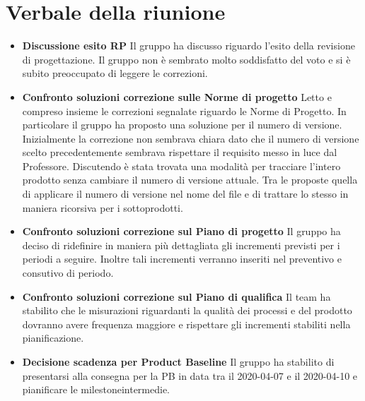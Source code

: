 \section{Verbale della riunione}
	\begin{itemize}
	\item \textbf{Discussione esito RP}
	Il gruppo ha discusso riguardo l'esito della revisione di progettazione. Il gruppo non è sembrato molto soddisfatto del voto e si è subito preoccupato di leggere le correzioni.
	\item \textbf{Confronto soluzioni correzione sulle Norme di progetto}
	Letto e compreso insieme le correzioni segnalate riguardo le Norme di Progetto. In particolare il gruppo ha proposto una soluzione per il numero di versione. Inizialmente la correzione non sembrava chiara dato che il numero di versione scelto precedentemente sembrava rispettare il requisito messo in luce dal Professore. Discutendo è stata trovata una modalità per tracciare l'intero prodotto senza cambiare il numero di versione attuale. Tra le proposte quella di applicare il numero di versione nel nome del file e di trattare lo stesso in maniera ricorsiva per i sottoprodotti.
	\item \textbf{Confronto soluzioni correzione sul Piano di progetto}
	Il gruppo ha deciso di ridefinire in maniera più dettagliata gli incrementi previsti per i periodi a seguire. Inoltre tali incrementi verranno inseriti nel preventivo e consutivo di periodo.
	\item \textbf{Confronto soluzioni correzione sul Piano di qualifica}
	Il team ha stabilito che le misurazioni riguardanti la qualità dei processi e del prodotto dovranno avere frequenza maggiore e rispettare gli incrementi stabiliti nella pianificazione.
	\item \textbf{Decisione scadenza per Product Baseline}
	Il gruppo ha stabilito di presentarsi alla consegna per la PB in data tra il 2020-04-07 e il 2020-04-10 e pianificare le milestone\glo intermedie.
	\end{itemize}
